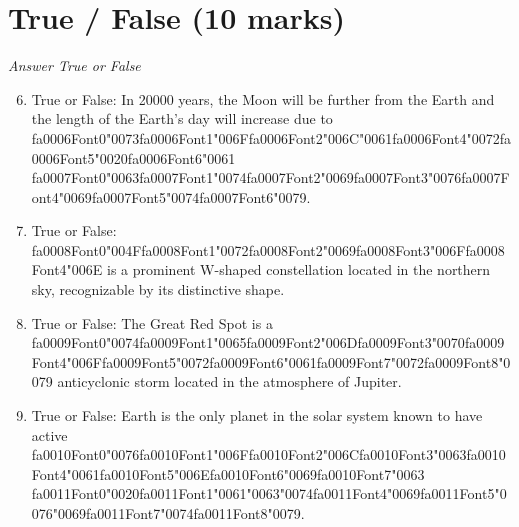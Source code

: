 \documentclass[12pt]{article}
\begin{document}
\section*{True / False (10 marks)}
\textit{Answer True or False}
\begin{enumerate}[label=\arabic*.]
\setcounter{enumi}{5}
\item True or False: In 20000 years, the Moon will be further from the Earth and the length of the Earth's day will increase due to {\csname fa0006Font0\endcsname\char"0073}{\csname fa0006Font1\endcsname\char"006F}{\csname fa0006Font2\endcsname\char"006C}{\char"0061}{\csname fa0006Font4\endcsname\char"0072}{\csname fa0006Font5\endcsname\char"0020}{\csname fa0006Font6\endcsname\char"0061} {\csname fa0007Font0\endcsname\char"0063}{\csname fa0007Font1\endcsname\char"0074}{\csname fa0007Font2\endcsname\char"0069}{\csname fa0007Font3\endcsname\char"0076}{\csname fa0007Font4\endcsname\char"0069}{\csname fa0007Font5\endcsname\char"0074}{\csname fa0007Font6\endcsname\char"0079}.
\item True or False: {\csname fa0008Font0\endcsname\char"004F}{\csname fa0008Font1\endcsname\char"0072}{\csname fa0008Font2\endcsname\char"0069}{\csname fa0008Font3\endcsname\char"006F}{\csname fa0008Font4\endcsname\char"006E} is a prominent W-shaped constellation located in the northern sky, recognizable by its distinctive shape.
\item True or False: The Great Red Spot is a {\csname fa0009Font0\endcsname\char"0074}{\csname fa0009Font1\endcsname\char"0065}{\csname fa0009Font2\endcsname\char"006D}{\csname fa0009Font3\endcsname\char"0070}{\csname fa0009Font4\endcsname\char"006F}{\csname fa0009Font5\endcsname\char"0072}{\csname fa0009Font6\endcsname\char"0061}{\csname fa0009Font7\endcsname\char"0072}{\csname fa0009Font8\endcsname\char"0079} anticyclonic storm located in the atmosphere of Jupiter.
\item True or False: Earth is the only planet in the solar system known to have active {\csname fa0010Font0\endcsname\char"0076}{\csname fa0010Font1\endcsname\char"006F}{\csname fa0010Font2\endcsname\char"006C}{\csname fa0010Font3\endcsname\char"0063}{\csname fa0010Font4\endcsname\char"0061}{\csname fa0010Font5\endcsname\char"006E}{\csname fa0010Font6\endcsname\char"0069}{\csname fa0010Font7\endcsname\char"0063} {\csname fa0011Font0\endcsname\char"0020}{\csname fa0011Font1\endcsname\char"0061}{\char"0063}{\char"0074}{\csname fa0011Font4\endcsname\char"0069}{\csname fa0011Font5\endcsname\char"0076}{\char"0069}{\csname fa0011Font7\endcsname\char"0074}{\csname fa0011Font8\endcsname\char"0079}.

\end{enumerate}
\end{document}
